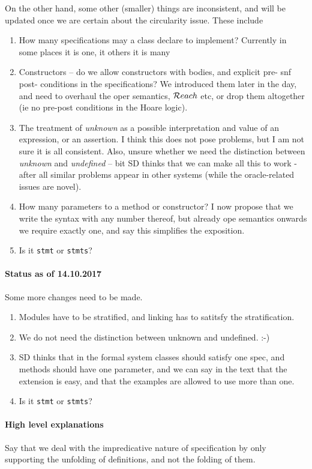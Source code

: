 \documentclass[preprint,10pt]{sigplanconf}
\newcommand{\prg}[1]{{\mbox{\tt{#1}}}}
\begin{document}
On the other hand, some other (smaller) things are inconsistent, and will be updated once we are certain about the circularity issue. These include
\begin{enumerate}
\item How many specifications may a class declare to implement? Currently in some places it is one, it others it is many
\item Constructors -- do we allow constructors with bodies, and explicit pre- snf post- conditions in the specifications? We introduced them later in the day, and need to overhaul the oper semantics, ${\mathcal{R}each}$ etc, or drop them altogether (ie no pre-post conditions in the Hoare logic).
\item The treatment of {\em unknown} as a possible interpretation and value of an expression, or an assertion. I think this does not pose problems, but I am not sure it is all consistent. Also, unsure whether we need the distinction between {\em unknown} and {\em undefined} -- bit SD thinks that we can make all this to work - after all similar problems appear in other systems (while the oracle-related issues are novel).
\item
How many parameters to a method or constructor? I now propose that we write the syntax with any number thereof, but already ope semantics onwards we require exactly one, and say this simplifies the exposition.
\item
Is it \prg{stmt} or \prg{stmts}?
\end{enumerate}

\paragraph{Status as of 14.10.2017} Some more changes need to be made.

\begin{enumerate}
\item Modules have to be stratified, and linking has to satitsfy the stratification.
\item We do not need the distinction between unknown and undefined. :-)
\item
SD thinks that in the formal system classes should satisfy one spec, and methods should have one parameter, and we can say in the text that the extension  is easy, and that the examples are allowed to use more than one.
\item
Is it \prg{stmt} or \prg{stmts}?
\end{enumerate}

\paragraph{High level explanations} Say that we deal with the impredicative nature of specification by only supporting the unfolding of definitions, and not the folding of them. 









%
%
%
%


\setlength{\bibsep}{0.0pt}

\end{document}
